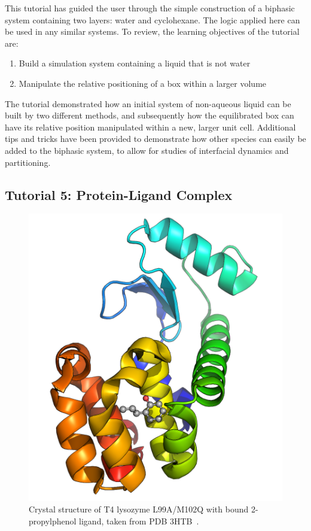 \documentclass[9pt,tutorial,pubversion]{livecoms}
\begin{document}
This tutorial has guided the user through the simple construction of a biphasic system containing two layers: water and cyclohexane. The logic applied here can be used in any similar systems. To review, the learning objectives of the tutorial are:

\begin{enumerate}
	\item Build a simulation system containing a liquid that is not water
	\item Manipulate the relative positioning of a box within a larger volume
\end{enumerate}

The tutorial demonstrated how an initial system of non-aqueous liquid can be built by two different methods, and subsequently how the equilibrated box can have its relative position manipulated within a new, larger unit cell. Additional tips and tricks have been provided to demonstrate how other species can easily be added to the biphasic system, to allow for studies of interfacial dynamics and partitioning.



\subsection{Tutorial 5: Protein-Ligand Complex} \label{prot_lig}

\begin{figure}[H]
\centering
\includegraphics{lysozyme_complex_3htb}
\caption{Crystal structure of T4 lysozyme L99A/M102Q with bound 2-propylphenol ligand, taken from PDB 3HTB~\cite{Boyce2009}.}
\label{lyso_complex_3htb_fig}
\end{figure}
\end{document}
